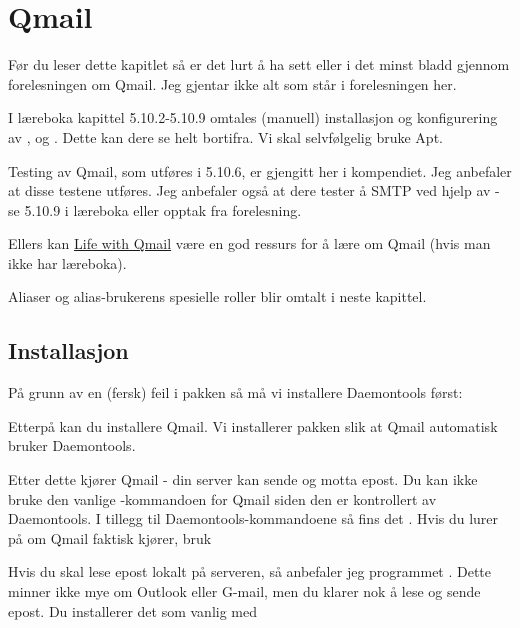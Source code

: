 \chapter{Qmail} %

Før du leser dette kapitlet så er det lurt å ha sett eller i det minst bladd gjennom
forelesningen om Qmail. Jeg gjentar ikke alt som står i forelesningen her.

I læreboka kapittel 5.10.2-5.10.9 omtales (manuell) installasjon og konfigurering av 
,  og . Dette kan dere se helt bortifra.
Vi skal selvfølgelig bruke Apt.

Testing av Qmail, som utføres i 5.10.6, er gjengitt her i kompendiet. Jeg anbefaler
at disse testene utføres. Jeg anbefaler også at dere tester å 
SMTP ved hjelp av  - se 5.10.9 i læreboka eller opptak fra forelesning.

Ellers kan \href{http://www.lifewithqmail.org/lwq.html}{Life with Qmail} være en god ressurs
for å lære om Qmail (hvis man ikke har læreboka).

\begin{remark}
Aliaser og alias-brukerens spesielle roller blir omtalt i neste kapittel.
\end{remark}


\section{Installasjon}

På grunn av en (fersk) feil i pakken  så må vi installere Daemontools 
først:


Etterpå kan du installere Qmail. Vi installerer pakken  slik at 
Qmail automatisk bruker Daemontools.


Etter dette kjører Qmail - din server kan sende og motta epost. Du kan ikke bruke 
den vanlige -kommandoen for Qmail siden den er kontrollert av 
Daemontools. I tillegg til Daemontools-kommandoene så fins det .
Hvis du lurer på om Qmail faktisk kjører, bruk


Hvis du skal lese epost lokalt på serveren, så anbefaler jeg programmet . 
Dette minner ikke mye om Outlook eller G-mail, men du klarer nok å lese og sende epost.
Du installerer det som vanlig med

